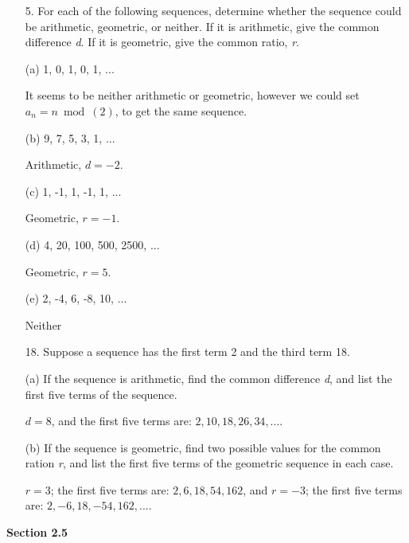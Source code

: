 \documentclass{article}
\begin{document}
\begin{itemize}
    \newpage
    
    \item[5.] For each of the following sequences, determine whether the sequence could be arithmetic, geometric, or neither.  If it is arithmetic, give the common difference \emph{d}. If it is geometric, give the common ratio, \emph{r}.
    
    (a) 1, 0, 1, 0, 1, ... 
    
    {\color{blue} It seems to be neither arithmetic or geometric, however we could set $a_n=n\bmod(2)$, to get the same sequence.}
    
    (b) 9, 7, 5, 3, 1, ...
    
    {\color{blue} Arithmetic, $d=-2$.}
    
    (c) 1, -1, 1, -1, 1, ...
    
    {\color{blue}Geometric, $r=-1$.}
    
    (d) 4, 20, 100, 500, 2500, ...
    
    {\color{blue}Geometric, $r=5$.}
    
    (e) 2, -4, 6, -8, 10, ...
    
    {\color{blue}Neither}
    
    \item[18.] Suppose a sequence has the first term 2 and the third term 18.
    
    (a) If the sequence is arithmetic, find the common difference \emph{d}, and list the first five terms of the sequence.
    
    {\color{blue} $d=8$, and the first five terms are: $2,10,18,26,34,...$.}
    
    (b) If the sequence is geometric, find two possible values for the common ration \emph{r}, and list the first five terms of the geometric sequence in each case. 
    
    {\color{blue} $r=3$; the first five terms are: $2,6,18,54,162$, and $r=-3$; the first five terms are: $2,-6,18,-54,162,...$.} 
    
\end{itemize}

\textbf{Section 2.5}
\end{document}
